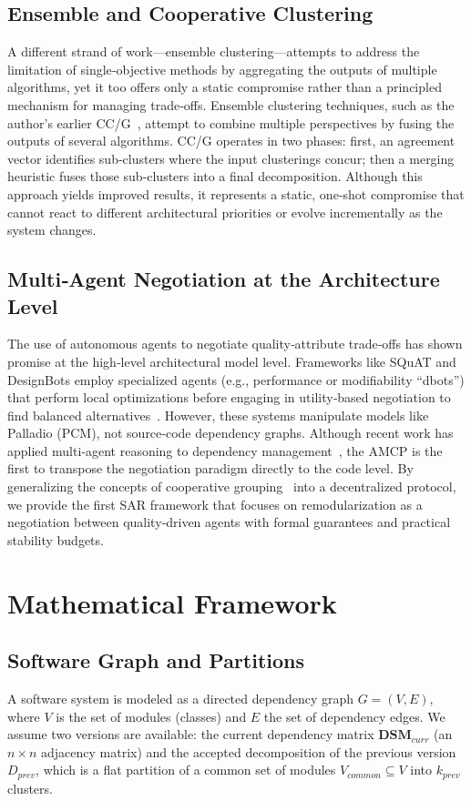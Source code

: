 \documentclass[conference]{IEEEtran}
\begin{document}
\subsection{Ensemble and Cooperative Clustering}
A different strand of work—ensemble clustering—attempts to address the limitation of single‑objective methods by aggregating the outputs of multiple algorithms, yet it too offers only a static compromise rather than a principled mechanism for managing trade‑offs. Ensemble clustering techniques, such as the author’s earlier CC/G~\cite{Ibrahim2014}, attempt to combine multiple perspectives by fusing the outputs of several algorithms. CC/G operates in two phases: first, an agreement vector identifies sub‑clusters where the input clusterings concur; then a merging heuristic fuses those sub‑clusters into a final decomposition. Although this approach yields improved results, it represents a static, one‑shot compromise that cannot react to different architectural priorities or evolve incrementally as the system changes.

\subsection{Multi‑Agent Negotiation at the Architecture Level}
The use of autonomous agents to negotiate quality‑attribute trade‑offs has shown promise at the high‑level architectural model level. Frameworks like SQuAT and DesignBots employ specialized agents (e.g., performance or modifiability ``dbots'') that perform local optimizations before engaging in utility‑based negotiation to find balanced alternatives~\cite{Pace2023,Monteserin2017,Rago2017}. However, these systems manipulate models like Palladio (PCM), not source‑code dependency graphs. Although recent work has applied multi‑agent reasoning to dependency management~\cite{Alhanahnah2024,Li2025}, the AMCP is the first to transpose the negotiation paradigm directly to the code level. By generalizing the concepts of cooperative grouping~\cite{Ibrahim2022} into a decentralized protocol, we provide the first SAR framework that focuses on remodularization as a negotiation between quality‑driven agents with formal guarantees and practical stability budgets.

\section{Mathematical Framework}
\label{sec:math}

\subsection{Software Graph and Partitions}
A software system is modeled as a directed dependency graph $G = (V,E)$, where $V$ is the set of modules (classes) and $E$ the set of dependency edges. We assume two versions are available: the current dependency matrix $\mathbf{DSM}_{curr}$ (an $n\times n$ adjacency matrix) and the accepted decomposition of the previous version $D_{prev}$, which is a flat partition of a common set of modules $V_{common} \subseteq V$ into $k_{prev}$ clusters.
\end{document}
